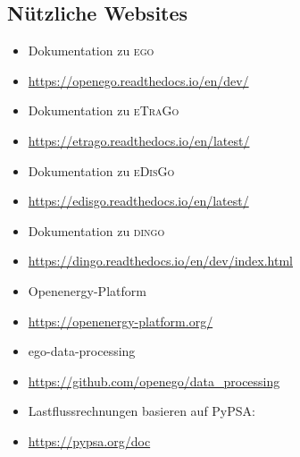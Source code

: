 \documentclass[
a4paper,     %
12pt         %
]{scrartcl}  %
\begin{document}
\subsection{Nützliche Websites}
\begin{itemize}
	\item Dokumentation zu \textsc{ego}
	\item[] \url{https://openego.readthedocs.io/en/dev/}
	\item Dokumentation zu \textsc{eTraGo}
	\item[] \url{https://etrago.readthedocs.io/en/latest/}
	\item Dokumentation zu \textsc{eDisGo}
	\item[] \url{https://edisgo.readthedocs.io/en/latest/}
	\item Dokumentation zu \textsc{dingo}
	\item[] \url{https://dingo.readthedocs.io/en/dev/index.html}
	\item Openenergy-Platform
	\item[] \url{https://openenergy-platform.org/}
	\item ego-data-processing
	\item[] \url{https://github.com/openego/data_processing}
	\item Lastflussrechnungen basieren auf PyPSA:
	\item[] \url{https://pypsa.org/doc}
\end{itemize}
\end{document}
